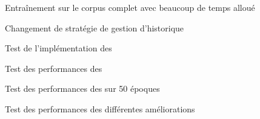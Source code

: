 \begin{report}{Entraînement sur le corpus complet avec beaucoup de temps alloué}\label{subsec:long_train}
	
\end{report}
\begin{report}{Changement de stratégie de gestion d'historique}\label{subsec:change_history}
	
\end{report}
\begin{report}{Test de l'implémentation des }\label{subsec:test_batch}\label{subsec:batch_2}
	
\end{report}
\begin{report}{Test des performances des }\label{subsec:test_batch_perf}\label{subsec:batch_3}
	
\end{report}
\begin{report}{Test des performances des  sur 50 époques}\label{subsec:test_batch_perf_}\label{subsec:batch_4}
	
\end{report}
\begin{report}{Test des performances des différentes améliorations}\label{subsec:test_perf}
	
\end{report}





%
